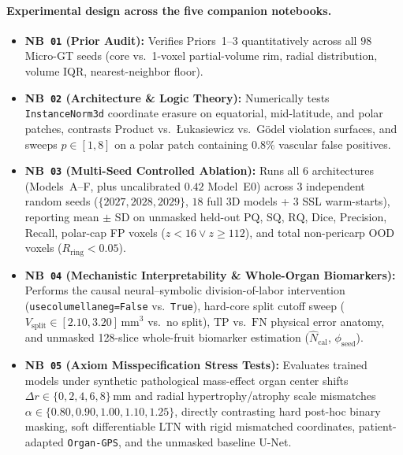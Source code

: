 \documentclass[10pt,a4paper]{article}
\renewcommand{\_}{\origunderscore\allowbreak}
\begin{document}
\paragraph{Experimental design across the five companion notebooks.}
\begin{itemize}
    \item \textbf{NB~\texttt{01} (Prior Audit):} Verifies Priors~1--3 quantitatively across all $98$ Micro-GT seeds (core vs.\ 1-voxel partial-volume rim, radial distribution, volume IQR, nearest-neighbor floor).
    \item \textbf{NB~\texttt{02} (Architecture \& Logic Theory):} Numerically tests \texttt{InstanceNorm3d} coordinate erasure on equatorial, mid-latitude, and polar patches, contrasts Product vs.\ {\L}ukasiewicz vs.\ G\"odel violation surfaces, and sweeps $p \in [1, 8]$ on a polar patch containing $0.8\%$ vascular false positives.
    \item \textbf{NB~\texttt{03} (Multi-Seed Controlled Ablation):} Runs all $6$ architectures (Models~A--F, plus uncalibrated $0.42$ Model~E0) across $3$ independent random seeds ($\{2027, 2028, 2029\}$, $18$ full 3D models + $3$ SSL warm-starts), reporting mean $\pm$ SD on unmasked held-out $\text{PQ}$, $\text{SQ}$, $\text{RQ}$, $\text{Dice}$, Precision, Recall, polar-cap FP voxels ($z < 16 \lor z \ge 112$), and total non-pericarp OOD voxels ($R_{\text{ring}} < 0.05$).
    \item \textbf{NB~\texttt{04} (Mechanistic Interpretability \& Whole-Organ Biomarkers):} Performs the causal neural--symbolic division-of-labor intervention (\texttt{use\_columella\_neg=False} vs.\ \texttt{True}), hard-core split cutoff sweep ($V_{\text{split}} \in [2.10, 3.20]\,\text{mm}^3$ vs.\ no split), $\text{TP}$ vs.\ $\text{FN}$ physical error anatomy, and unmasked 128-slice whole-fruit biomarker estimation ($\hat{N}_{\text{cal}}$, $\phi_{\text{seed}}$).
    \item \textbf{NB~\texttt{05} (Axiom Misspecification Stress Tests):} Evaluates trained models under synthetic pathological mass-effect organ center shifts $\Delta r \in \{0, 2, 4, 6, 8\}\,\text{mm}$ and radial hypertrophy/atrophy scale mismatches $\alpha \in \{0.80, 0.90, 1.00, 1.10, 1.25\}$, directly contrasting hard post-hoc binary masking, soft differentiable LTN with rigid mismatched coordinates, patient-adapted \texttt{Organ-GPS}, and the unmasked baseline U-Net.
\end{itemize}

\clearpage
\end{document}
